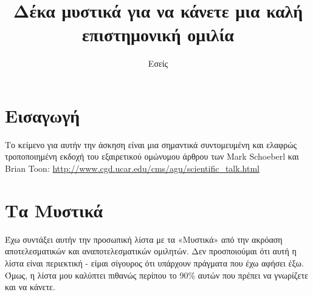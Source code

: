 \documentclass[12pt]{article}
\title{Δέκα μυστικά για να κάνετε μια καλή επιστημονική ομιλία}
\author{Εσείς}
\begin{document}
\maketitle

\section{Εισαγωγή}

Το κείμενο για αυτήν την άσκηση είναι μια σημαντικά συντομευμένη και ελαφρώς τροποποιημένη εκδοχή του εξαιρετικού ομώνυμου άρθρου των \textlatin{Mark Schoeberl} και \textlatin{Brian Toon}:
\textlatin{ \url{http://www.cgd.ucar.edu/cms/agu/scientific_talk.html}}

\section{Τα Μυστικά}

Έχω συντάξει αυτήν την προσωπική λίστα με τα «Μυστικά» από την ακρόαση αποτελεσματικών και αναποτελεσματικών ομιλητών. Δεν προσποιούμαι ότι αυτή η λίστα είναι περιεκτική - είμαι σίγουρος ότι υπάρχουν πράγματα που έχω αφήσει έξω. Όμως, η λίστα μου καλύπτει πιθανώς περίπου το 90\% αυτών που πρέπει να γνωρίζετε και να κάνετε.
\end{document}
